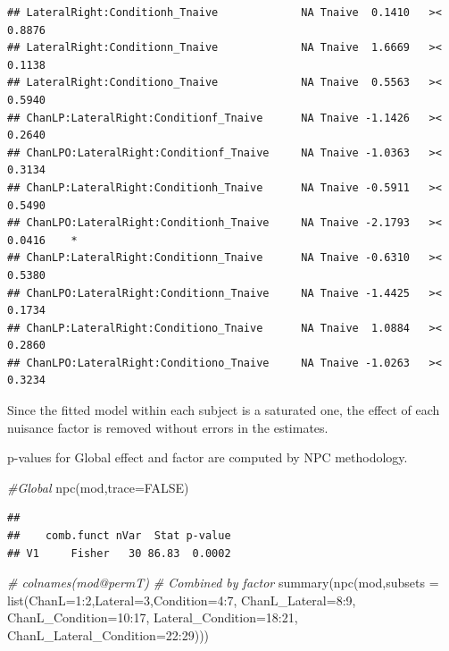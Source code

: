 \documentclass[
]{article}
\newenvironment{Shaded}{\begin{snugshade}}{\end{snugshade}}
\newcommand{\AttributeTok}[1]{\textcolor[rgb]{0.77,0.63,0.00}{#1}}
\newcommand{\CommentTok}[1]{\textcolor[rgb]{0.56,0.35,0.01}{\textit{#1}}}
\newcommand{\ConstantTok}[1]{\textcolor[rgb]{0.00,0.00,0.00}{#1}}
\newcommand{\DecValTok}[1]{\textcolor[rgb]{0.00,0.00,0.81}{#1}}
\newcommand{\FunctionTok}[1]{\textcolor[rgb]{0.00,0.00,0.00}{#1}}
\newcommand{\NormalTok}[1]{#1}
\newcommand{\SpecialCharTok}[1]{\textcolor[rgb]{0.00,0.00,0.00}{#1}}
\begin{document}
\begin{verbatim}
## LateralRight:Conditionh_Tnaive             NA Tnaive  0.1410   ><  0.8876     
## LateralRight:Conditionn_Tnaive             NA Tnaive  1.6669   ><  0.1138     
## LateralRight:Conditiono_Tnaive             NA Tnaive  0.5563   ><  0.5940     
## ChanLP:LateralRight:Conditionf_Tnaive      NA Tnaive -1.1426   ><  0.2640     
## ChanLPO:LateralRight:Conditionf_Tnaive     NA Tnaive -1.0363   ><  0.3134     
## ChanLP:LateralRight:Conditionh_Tnaive      NA Tnaive -0.5911   ><  0.5490     
## ChanLPO:LateralRight:Conditionh_Tnaive     NA Tnaive -2.1793   ><  0.0416    *
## ChanLP:LateralRight:Conditionn_Tnaive      NA Tnaive -0.6310   ><  0.5380     
## ChanLPO:LateralRight:Conditionn_Tnaive     NA Tnaive -1.4425   ><  0.1734     
## ChanLP:LateralRight:Conditiono_Tnaive      NA Tnaive  1.0884   ><  0.2860     
## ChanLPO:LateralRight:Conditiono_Tnaive     NA Tnaive -1.0263   ><  0.3234
\end{verbatim}

Since the fitted model within each subject is a saturated one, the
effect of each nuisance factor is removed without errors in the
estimates.

p-values for Global effect and factor are computed by NPC methodology.

\begin{Shaded}
\begin{Highlighting}[]
\CommentTok{\#Global}
\FunctionTok{npc}\NormalTok{(mod,}\AttributeTok{trace=}\ConstantTok{FALSE}\NormalTok{)}
\end{Highlighting}
\end{Shaded}

\begin{verbatim}
## 
##    comb.funct nVar  Stat p-value
## V1     Fisher   30 86.83  0.0002
\end{verbatim}

\begin{Shaded}
\begin{Highlighting}[]
\CommentTok{\# colnames(mod@permT)}
\CommentTok{\# Combined by factor}
\FunctionTok{summary}\NormalTok{(}\FunctionTok{npc}\NormalTok{(mod,}\AttributeTok{subsets =} \FunctionTok{list}\NormalTok{(}\AttributeTok{ChanL=}\DecValTok{1}\SpecialCharTok{:}\DecValTok{2}\NormalTok{,}\AttributeTok{Lateral=}\DecValTok{3}\NormalTok{,}\AttributeTok{Condition=}\DecValTok{4}\SpecialCharTok{:}\DecValTok{7}\NormalTok{,}
                       \AttributeTok{ChanL\_Lateral=}\DecValTok{8}\SpecialCharTok{:}\DecValTok{9}\NormalTok{,}
                       \AttributeTok{ChanL\_Condition=}\DecValTok{10}\SpecialCharTok{:}\DecValTok{17}\NormalTok{,}
                       \AttributeTok{Lateral\_Condition=}\DecValTok{18}\SpecialCharTok{:}\DecValTok{21}\NormalTok{,}
                       \AttributeTok{ChanL\_Lateral\_Condition=}\DecValTok{22}\SpecialCharTok{:}\DecValTok{29}\NormalTok{)))}
\end{Highlighting}
\end{Shaded}
\end{document}
